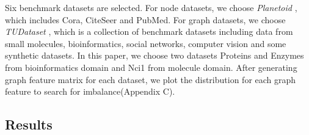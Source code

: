 \documentclass[runningheads]{llncs}
\newcommand{\xhdr}[1]{\vspace{1.7mm}\noindent{{\bf #1}}}
\begin{document}
\xhdr{Datasets} Six benchmark datasets are selected.  For node datasets, we choose \textit{Planetoid} \cite{hamilton2017inductive}, which includes {\sc Cora}, {\sc CiteSeer} and {\sc PubMed}. For graph datasets, we choose \textit{TUDataset} \cite{morris2020tudataset}, which is a collection of benchmark datasets including data from small molecules, bioinformatics, social networks, computer vision and 
some synthetic datasets. In this paper, we choose two datasets  {\sc Proteins} and {\sc 
Enzymes} from bioinformatics domain and {\sc Nci1} from molecule domain. After generating graph feature matrix for each dataset, we plot the distribution for each graph feature to search for imbalance(Appendix C). 
\vspace{-0.6cm}
\subsection{Results}
\vspace{-0.6cm}
\end{document}
